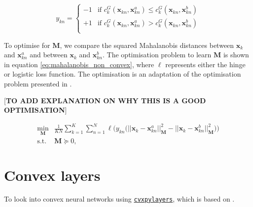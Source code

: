 \begin{equation} \label{eq:response_definition}
	y_{kn} = \begin{cases}
		-1 & \text{if } c^G_k(\mathbf{x}_{kn}, \mathbf{x}^a_{kn}) \leq c^G_k(\mathbf{x}_{kn}, \mathbf{x}^b_{kn}) \\
		+1 & \text{if } c^G_k(\mathbf{x}_{kn}, \mathbf{x}^a_{kn}) > c^G_k(\mathbf{x}_{kn}, \mathbf{x}^b_{kn}) \\
	\end{cases}
\end{equation}

To optimise for $\textbf{M}$, we compare the squared Mahalanobis distances between $\textbf{x}_k$ and $\textbf{x}^a_{kn}$ and between $\textbf{x}_k$ and $\textbf{x}^b_{kn}$. The optimisation problem to learn $\textbf{M}$ is shown in equation \ref{eq:mahalanobis_non_convex}, where $\ell$ represents either the hinge or logistic loss function. The optimisation is an adaptation of the optimisation problem presented in \textcite{canalOneAllSimultaneous2022}.

[\textbf{TO ADD EXPLANATION ON WHY THIS IS A GOOD OPTIMISATION}]

\begin{align} \label{eq:mahalanobis_non_convex}
	\min_{\mathbf{M}} & \frac{1}{KN} \sum_{k=1}^K \sum_{n=1}^N \ell \bigg( y_{kn} \big(|| \mathbf{x}_k - \mathbf{x}_{kn}^a ||^2_{\mathbf{M}} - || \mathbf{x}_k - \mathbf{x}_{kn}^b ||^2_{\mathbf{M}} \big) \bigg) \\	
	\text{s.t. } & \mathbf{M} \succeq 0, \nonumber
\end{align}

\section{Convex layers}

To look into convex neural networks using \href{https://github.com/cvxgrp/cvxpylayers}{\texttt{cvxpylayers}}, which is based on \textcite{agrawalDifferentiableConvexOptimization2019}.
